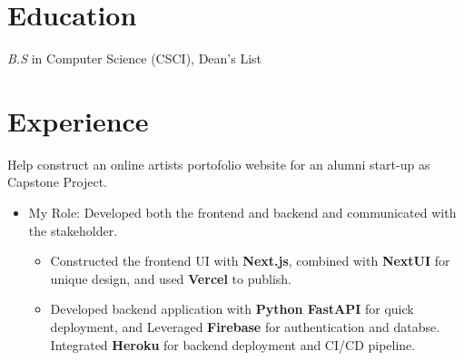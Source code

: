 \documentclass{resume}
\begin{document}



\section{Education}
\textit{B.S} in Computer Science (CSCI), Dean's List

\section{Experience}

  Help construct an online artists portofolio website for an alumni start-up as Capstone Project.
  \begin{itemize}
  \item My Role: Developed both the frontend and backend and communicated with the stakeholder.
  \begin{itemize}
    \item Constructed the frontend UI with \textbf{Next.js}, combined with \textbf{NextUI} for unique design, and used \textbf{Vercel} to publish.
    \item Developed backend application with \textbf{Python FastAPI} for quick deployment, and Leveraged \textbf{Firebase} for authentication and databse. Integrated \textbf{Heroku} for backend deployment and CI/CD pipeline.
  \end{itemize}
  \end{itemize}
\end{document}
